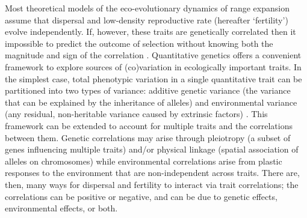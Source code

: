 \documentclass[11pt]{article}
\newcommand{\revise}[1]{{\color{Mahogany}{#1}}}
\begin{document}
Most theoretical models of the eco-evolutionary dynamics of range expansion assume that dispersal and low-density reproductive rate (hereafter `fertility') evolve independently.
If, however, these traits are genetically correlated then it \revise{is} impossible to predict the outcome of selection without knowing both the magnitude and sign of the correlation \citep{lande_measurement_1983,chenoweth2010contribution}.
Quantitative genetics offers a convenient framework to explore sources of (co)variation in ecologically important traits.
In the simplest case, total phenotypic variation in a single quantitative trait can be partitioned into two types of variance: additive genetic variance (the variance that can be explained by the inheritance of alleles) and environmental variance (any residual, non-heritable variance caused by extrinsic factors) \citep{lynch_genetics_1998,kruuk_estimating_2004,wilson_ecologists_2010}.
This framework can be extended to account for multiple traits and the correlations between them.
Genetic correlations may arise through pleiotropy (a subset of genes influencing multiple traits) and/or physical linkage (spatial association of alleles on chromosomes) \citep{roff_evolutionary_1997} while environmental correlations arise from plastic responses to the environment that are non-independent across traits.
There are, then, many ways for dispersal and fertility to interact via trait correlations; the correlations can be positive or negative, and can be due to genetic effects, environmental effects, or both.
\end{document}
